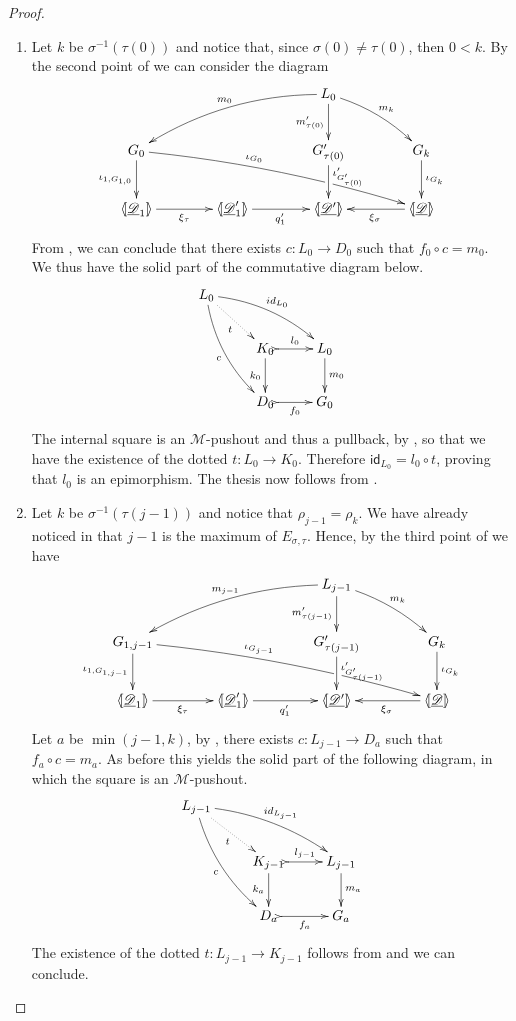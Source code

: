 \documentclass[a4paper,UKenglish,cleveref,pdftex, thm-restate,numberwithinsect]{lipics}
\newcommand{\id}[1]{\mathsf{id}_{#1}}
\newcommand{\dder}[1]{\mathscr{#1}}
\newcommand{\der}[1]{\underline{\dder{#1}}}
\newcommand{\lpro}{\langle \hspace{-1.85pt}[}
\newcommand{\rpro}{]\hspace{-1.85pt}\rangle}
\newcommand{\tpro}[1]{\lpro \der{#1}\rpro}
\begin{document}
\begin{proof}
	\begin{enumerate}
		\item Let $k$ be $\sigma^{-1}(\tau(0))$ and notice that, since $\sigma(0)\neq \tau(0)$, then $0< k$.  By  the second point of   we can consider the diagram
		\[\xymatrix@C=40pt{&& L_0 \ar[d]_{m'_{\tau(0)}} \ar@/^.2cm/[dr]^{m_{k}} \ar@/_.4cm/[dll]_{m_{0}} \\G_{0} \ar@/^.2cm/[drrr]^(.4){\iota_{G_0}}|(.67)\hole \ar[d]_{\iota_{1,G_{1,0}}}& &G'_{\tau(0)} \ar[d]^(.45){\iota'_{G'_{\tau(0)}}} & G_{k} \ar[d]^{\iota_{G_k}}\\ \lpro\der{D}_1 \rpro \ar[r]_{\xi_{\tau}} &\lpro \der{D}'_1\rpro \ar[r]_{q'_1} & \lpro \der{D'}\rpro & \tpro{D} \ar[l]^{\xi_{\sigma}}}\]
		From , we can conclude that there exists $c\colon L_0\to D_0$ such that $f_0\circ c=m_0$. We thus have the solid part of the commutative diagram below.
		\[\xymatrix{L_0 \ar@/^.3cm/[drr]^{\id{L_0}} \ar@{.>}[dr]_{t} \ar@/_.3cm/[ddr]_{c}\\ & K_0 \ar[d]_{k_0}\ar@{>->}[r]^{l_0}& L_0 \ar[d]^{m_0} \\& D_0 \ar@{>->}[r]_{f_0} & G_0} \]
		The internal square is an $\mathcal{M}$-pushout and thus a pullback, by , so that we have the existence of the dotted $t\colon L_0\to K_0$. Therefore $\id{L_0}=l_0\circ t$, proving that $l_0$ is an epimorphism. The thesis now follows from . 
		\item  Let $k$ be $\sigma^{-1}(\tau(j-1))$ and notice that $\rho_{j-1}=\rho_k$. We have already noticed in  that $j-1$ is the maximum of $E_{\sigma, \tau}$.  Hence, by the third point of  we have
		\[\xymatrix@C=40pt{&& L_{j-1} \ar[d]_{m'_{\tau({j-1})}} \ar@/^.2cm/[dr]^{m_{k}} \ar@/_.4cm/[dll]_{m_{{j-1}}} \\G_{1,{j-1}} \ar@/^.2cm/[drrr]^(.4){\iota_{G_{j-1}}}|(.67)\hole \ar[d]_{\iota_{1,G_{1,j-1}}}& &G'_{\tau({j-1})} \ar[d]^{\iota'_{G'_{\tau({j-1})}}} & G_{k} \ar[d]^{\iota_{G_k}}\\ \lpro\der{D}_1 \rpro \ar[r]_{\xi_{\tau}} &\lpro \der{D}'_1\rpro \ar[r]_{q'_1} & \lpro \der{D'}\rpro & \tpro{D} \ar[l]^{\xi_{\sigma}}}\]
		Let $a$ be $\min(j-1, k)$, by ,  there exists $c\colon L_{j-1}\to D_a$ such that $f_a\circ c=m_a$. As before this yields the solid part of the following diagram, in which the square is an $\mathcal{M}$-pushout.
		\[\xymatrix{L_{j-1} \ar@/^.3cm/[drr]^{\id{L_{j-1}}} \ar@{.>}[dr]_{t} \ar@/_.3cm/[ddr]_{c}\\ & K_{j-1} \ar[d]_{k_a}\ar@{>->}[r]^{l_{j-1}}& L_{j-1} \ar[d]^{m_a} \\& D_a \ar@{>->}[r]_{f_a} & G_a} \]
		The existence of the dotted $t\colon L_{j-1}\to K_{j-1}$ follows from   and we can conclude. \qedhere
	\end{enumerate}
\end{proof}
\end{document}
